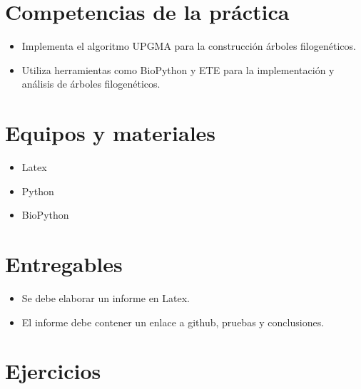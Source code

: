 \documentclass{article}
\begin{document}
	
	\section{Competencias de la práctica}
	\begin{itemize}
		\item Implementa el algoritmo UPGMA para la construcción árboles filogenéticos. 
		\item Utiliza herramientas como BioPython y ETE para la implementación y análisis de árboles filogenéticos.
	\end{itemize}
	
	\section{Equipos y materiales}
	\begin{itemize}
		\item Latex
		\item Python
		\item BioPython
	\end{itemize}
	
	\section{Entregables}
	\begin{itemize}
		\item Se debe elaborar un informe en Latex.
		\item El informe debe contener un enlace a github, pruebas y conclusiones.
	\end{itemize}
	
	
	
	
	\clearpage
	
	
	\section{Ejercicios}\label{sec:ejercicios}
		
\end{document}
